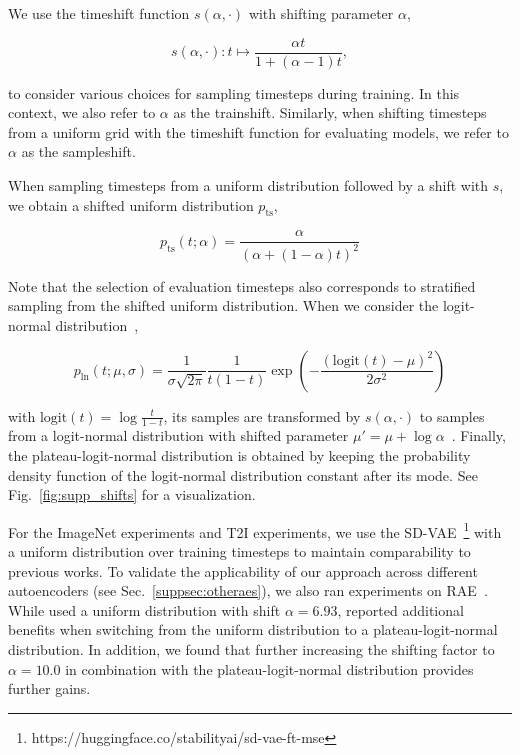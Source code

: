 \documentclass{article}
\theoremstyle{plain}
\theoremstyle{definition}
\theoremstyle{remark}
\begin{document}
We use the timeshift function $s(\alpha, \cdot)$ \cite{sd3,bfl2025representation} with shifting parameter $\alpha$,

\begin{equation}
s(\alpha, \cdot): t \mapsto \frac{\alpha t}{1 + (\alpha - 1) t},
\end{equation}

to consider various choices for sampling timesteps during training. In this context, we also refer to $\alpha$ as the trainshift. Similarly, when shifting timesteps from a uniform grid with the timeshift function for evaluating models, we refer to $\alpha$ as the sampleshift.

When sampling timesteps from a uniform distribution followed by a shift with $s$, we obtain a shifted uniform distribution $p_\text{ts}$,

\begin{equation}
p_\text{ts}(t; \alpha) = \frac{\alpha}{(\alpha + (1-\alpha)t)^2}
\end{equation}

Note that the selection of evaluation timesteps also corresponds to stratified sampling from the shifted uniform distribution. When we consider the logit-normal distribution~\citep{sd3},

\begin{equation}
p_\text{ln}(t; \mu, \sigma) = \frac{1}{\sigma \sqrt{2\pi}} \frac{1}{t(1-t)}\exp\left(-\frac{(\text{logit}(t) - \mu)^2}{2\sigma^2}\right)
\end{equation}

with $\text{logit}(t) = \log\frac{t}{1-t}$, its samples are transformed by $s(\alpha, \cdot)$ to samples from a logit-normal distribution with shifted parameter $\mu' = \mu + \log \alpha$~\citep{bfl2025representation}. Finally, the plateau-logit-normal distribution is obtained by keeping the probability density function of the logit-normal distribution constant after its mode. See Fig.~\ref{fig:supp_shifts} for a visualization.

For the ImageNet experiments and T2I experiments, we use the SD-VAE~\footnote{https://huggingface.co/stabilityai/sd-vae-ft-mse} with a uniform distribution over training timesteps to maintain comparability to previous works. To validate the applicability of our approach across different autoencoders (see Sec.~\ref{suppsec:otheraes}), we also ran experiments on RAE~\cite{rae}. While \citet{rae} used a uniform distribution with shift $\alpha=6.93$, \citet{bfl2025representation} reported additional benefits when switching from the uniform distribution to a plateau-logit-normal distribution. In addition, we found that further increasing the shifting factor to $\alpha=10.0$ in combination with the plateau-logit-normal distribution provides further gains.
\end{document}
